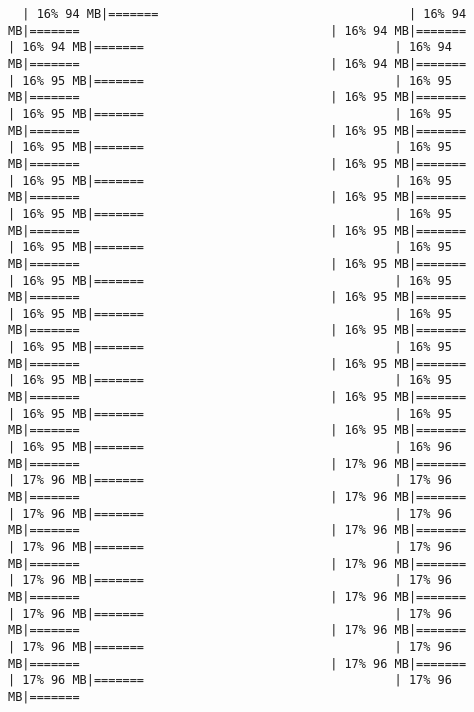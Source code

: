 \documentclass[
]{article}
\begin{document}
\begin{verbatim}
  | 16% 94 MB|=======                                   | 16% 94 MB|=======                                   | 16% 94 MB|=======                                   | 16% 94 MB|=======                                   | 16% 94 MB|=======                                   | 16% 94 MB|=======                                   | 16% 95 MB|=======                                   | 16% 95 MB|=======                                   | 16% 95 MB|=======                                   | 16% 95 MB|=======                                   | 16% 95 MB|=======                                   | 16% 95 MB|=======                                   | 16% 95 MB|=======                                   | 16% 95 MB|=======                                   | 16% 95 MB|=======                                   | 16% 95 MB|=======                                   | 16% 95 MB|=======                                   | 16% 95 MB|=======                                   | 16% 95 MB|=======                                   | 16% 95 MB|=======                                   | 16% 95 MB|=======                                   | 16% 95 MB|=======                                   | 16% 95 MB|=======                                   | 16% 95 MB|=======                                   | 16% 95 MB|=======                                   | 16% 95 MB|=======                                   | 16% 95 MB|=======                                   | 16% 95 MB|=======                                   | 16% 95 MB|=======                                   | 16% 95 MB|=======                                   | 16% 95 MB|=======                                   | 16% 95 MB|=======                                   | 16% 95 MB|=======                                   | 16% 95 MB|=======                                   | 16% 95 MB|=======                                   | 16% 95 MB|=======                                   | 16% 95 MB|=======                                   | 16% 95 MB|=======                                   | 16% 95 MB|=======                                   | 16% 95 MB|=======                                   | 16% 96 MB|=======                                   | 17% 96 MB|=======                                   | 17% 96 MB|=======                                   | 17% 96 MB|=======                                   | 17% 96 MB|=======                                   | 17% 96 MB|=======                                   | 17% 96 MB|=======                                   | 17% 96 MB|=======                                   | 17% 96 MB|=======                                   | 17% 96 MB|=======                                   | 17% 96 MB|=======                                   | 17% 96 MB|=======                                   | 17% 96 MB|=======                                   | 17% 96 MB|=======                                   | 17% 96 MB|=======                                   | 17% 96 MB|=======                                   | 17% 96 MB|=======                                   | 17% 96 MB|=======                                   | 17% 96 MB|=======                                   | 17% 96 MB|=======                                   | 17% 96 MB|=======                                   | 17% 96 MB|=======    
\end{verbatim}
\end{document}
